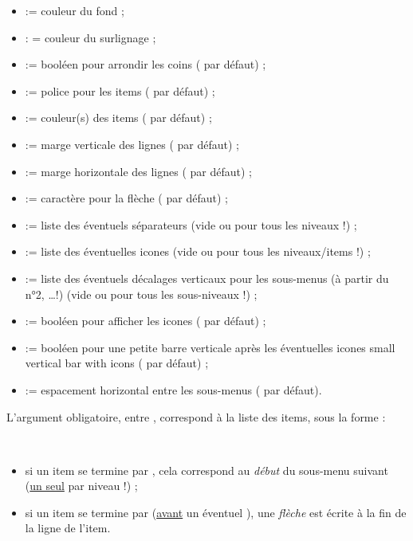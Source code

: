 \documentclass[11pt,a4paper]{ltxdoc}
\begin{document}
\begin{itemize}
	\item {} := couleur du fond ;
	\item {} : = couleur du surlignage ;
	\item {} := booléen pour arrondir les coins ( par défaut) ;
	\item {} := police pour les items ( par défaut) ;
	\item {} := couleur(s) des items ( par défaut) ;
	\item {} := marge verticale des lignes (\MontreCode{6pt} par défaut) ;
	\item {} := marge horizontale des lignes (\MontreCode{12pt} par défaut) ;
	\item {} := caractère pour la flèche ( par défaut) ;
	\item {} := liste des éventuels séparateurs (vide ou pour tous les niveaux !) ;
	\item {} := liste des éventuelles icones  (vide ou pour tous les niveaux/items !) ;
	\item {} := liste des éventuels décalages verticaux pour les sous-menus (à partir du n°2, \ldots !) (vide ou pour tous les sous-niveaux !) ;
	\item {} := booléen pour afficher les icones ( par défaut) ;
	\item {} := booléen pour une petite barre verticale après les éventuelles icones small vertical bar with icons ( par défaut) ;
	\item {} := espacement horizontal entre les sous-menus ( par défaut).
\end{itemize}

\medskip

L'argument obligatoire, entre , correspond à la liste des items, sous la forme :

\smallskip

\hfill{}\hfill~

\begin{itemize}
	\item si un item se termine par \MontreCode{(*)}, cela correspond au \textit{début} du sous-menu suivant (\underline{un seul} par niveau !) ;
	\item si un item se termine par \MontreCode{(>)} (\underline{avant} un éventuel \MontreCode{(*)}), une \textit{flèche} est écrite à la fin de la ligne de l'item.
\end{itemize}
\end{document}
